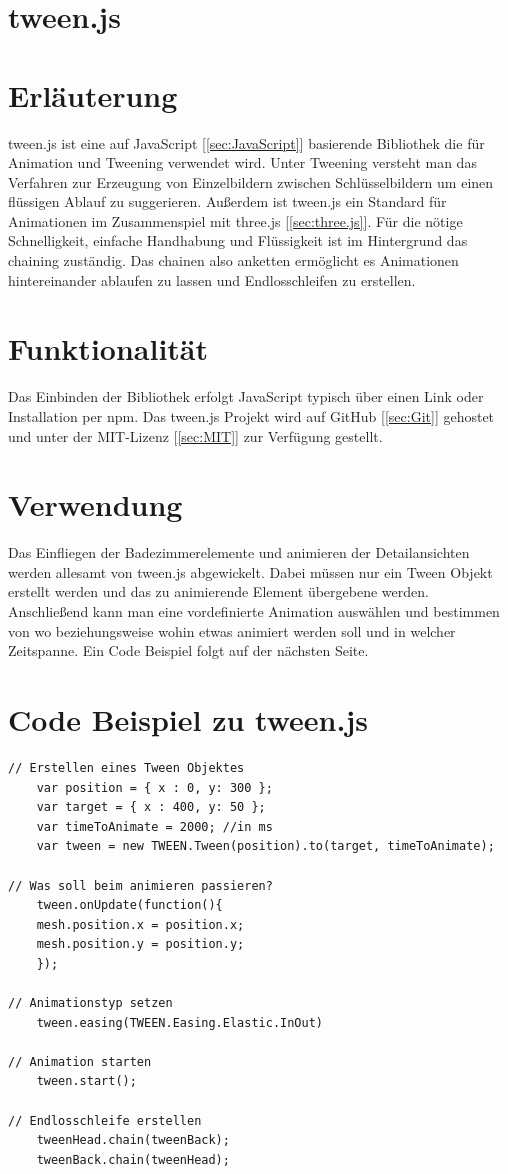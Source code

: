 \newpage
\clearpage
\section{tween.js}\label{sec:tween.js}
\cite{tween.js_tutorial}\cite{tween.js_GitHub}\cite{tween.js_createjs}
\section*{Erläuterung}
tween.js ist eine auf JavaScript [\ref{sec:JavaScript}] basierende Bibliothek die für Animation und Tweening verwendet wird. Unter Tweening versteht man das Verfahren zur Erzeugung von Einzelbildern zwischen Schlüsselbildern um einen flüssigen Ablauf zu suggerieren. Außerdem ist tween.js ein Standard für Animationen im Zusammenspiel mit three.js [\ref{sec:three.js}]. Für die nötige Schnelligkeit, einfache Handhabung und Flüssigkeit ist im Hintergrund das chaining zuständig. Das chainen also anketten ermöglicht es Animationen hintereinander ablaufen zu lassen und Endlosschleifen zu erstellen. 

\section*{Funktionalität}
Das Einbinden der Bibliothek erfolgt JavaScript typisch über einen Link oder Installation per npm.
Das tween.js Projekt wird auf GitHub [\ref{sec:Git}] gehostet und unter der MIT-Lizenz [\ref{sec:MIT}] zur Verfügung gestellt.

\section*{Verwendung}
Das Einfliegen der Badezimmerelemente und animieren der Detailansichten werden allesamt von tween.js abgewickelt. Dabei müssen nur ein Tween Objekt erstellt werden und das zu animierende Element übergebene werden. Anschließend kann man eine vordefinierte Animation auswählen und bestimmen von wo beziehungsweise wohin etwas animiert werden soll und in welcher Zeitspanne. Ein Code Beispiel folgt auf der nächsten Seite.

\newpage \clearpage
\section*{Code Beispiel zu tween.js}
\begin{lstlisting}
// Erstellen eines Tween Objektes
    var position = { x : 0, y: 300 };
    var target = { x : 400, y: 50 };
    var timeToAnimate = 2000; //in ms
    var tween = new TWEEN.Tween(position).to(target, timeToAnimate);
    
// Was soll beim animieren passieren?    
    tween.onUpdate(function(){
    mesh.position.x = position.x;
    mesh.position.y = position.y;
    });
    
// Animationstyp setzen    
    tween.easing(TWEEN.Easing.Elastic.InOut)

// Animation starten
    tween.start();

// Endlosschleife erstellen
    tweenHead.chain(tweenBack);
    tweenBack.chain(tweenHead);
\end{lstlisting}

